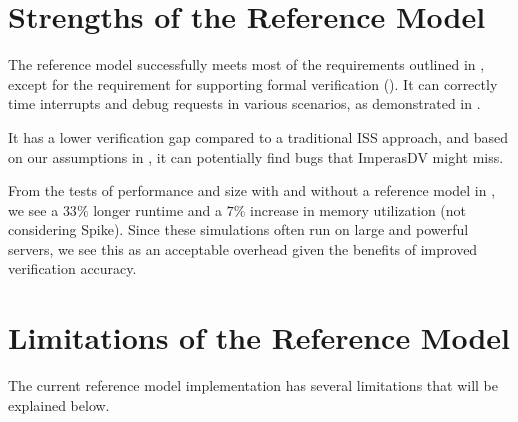 %


\section{Strengths of the Reference Model}

The reference model successfully meets most of the requirements outlined in , except for the requirement for supporting formal verification (). It can correctly time interrupts and debug requests in various scenarios, as demonstrated in .

It has a lower verification gap compared to a traditional ISS approach, and based on our assumptions in , it can potentially find bugs that ImperasDV might miss.

From the tests of performance and size with and without a reference model in , we see a $33\%$ longer runtime and a $7\%$ increase in memory utilization (not considering Spike). Since these simulations often run on large and powerful servers, we see this as an acceptable overhead given the benefits of improved verification accuracy.


\section{Limitations of the Reference Model}
\label{sec:discuss_limitations}

The current reference model implementation has several limitations that will be explained below.




